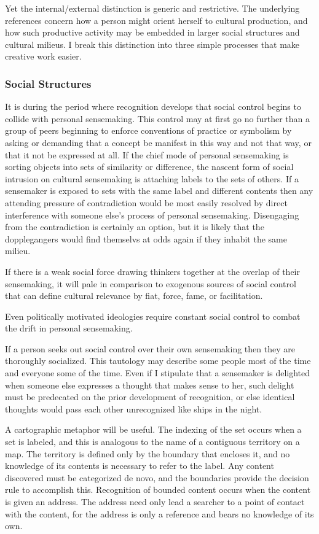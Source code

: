 \documentclass[]{article}
\begin{document}
Yet the internal/external distinction is generic and restrictive. The
underlying references concern how a person might orient herself to
cultural production, and how such productive activity may be embedded in
larger social structures and cultural milieus. I break this distinction
into three simple processes that make creative work easier.

\subsubsection{Social Structures}\label{social-structures}

It is during the period where recognition develops that social control
begins to collide with personal sensemaking. This control may at first
go no further than a group of peers beginning to enforce conventions of
practice or symbolism by asking or demanding that a concept be manifest
in this way and not that way, or that it not be expressed at all. If the
chief mode of personal sensemaking is sorting objects into sets of
similarity or difference, the nascent form of social intrusion on
cultural sensemaking is attaching labels to the sets of others. If a
sensemaker is exposed to sets with the same label and different contents
then any attending pressure of contradiction would be most easily
resolved by direct interference with someone else's process of personal
sensemaking. Disengaging from the contradiction is certainly an option,
but it is likely that the dopplegangers would find themselvs at odds
again if they inhabit the same milieu.

If there is a weak social force drawing thinkers together at the overlap
of their sensemaking, it will pale in comparison to exogenous sources of
social control that can define cultural relevance by fiat, force, fame,
or facilitation.

Even politically motivated ideologies require constant social control to
combat the drift in personal sensemaking.

If a person seeks out social control over their own sensemaking then
they are thoroughly socialized. This tautology may describe some people
most of the time and everyone some of the time. Even if I stipulate that
a sensemaker is delighted when someone else expresses a thought that
makes sense to her, such delight must be predecated on the prior
development of recognition, or else identical thoughts would pass each
other unrecognized like ships in the night.

A cartographic metaphor will be useful. The indexing of the set occurs
when a set is labeled, and this is analogous to the name of a contiguous
territory on a map. The territory is defined only by the boundary that
encloses it, and no knowledge of its contents is necessary to refer to
the label. Any content discovered must be categorized de novo, and the
boundaries provide the decision rule to accomplish this. Recognition of
bounded content occurs when the content is given an address. The address
need only lead a searcher to a point of contact with the content, for
the address is only a reference and bears no knowledge of its own.
\end{document}
